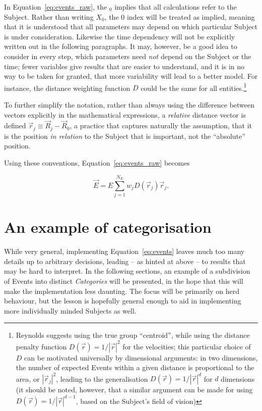 \documentclass[]{article} %
\begin{document}
In Equation~\eqref{eq:events_raw}, the $_0$ implies that all calculations refer to the Subject. 
Rather than writing $X_0$, the $0$ index will be treated as implied, meaning that it is understood that all parameters may depend on which particular Subject is under consideration.
Likewise the time dependency will not be explicitly written out in the following paragraphs.
It may, however, be a good idea to consider in every step, which parameters need \emph{not} depend on the Subject or the time; fewer variables give results that are easier to understand, and it is in no way to be taken for granted, that more variability will lead to a better model.
For instance, the distance weighting function $D$ could be the same for all entities.\footnote{Reynolds \cite{Reynolds1987} suggests using the true group ``centroid'', while using the distance penalty function $D(\vec{r}) = 1/\left|\vec{r}\right|^{2}$ for the velocities; this particular choice of $D$ can be motivated universally by dimensional arguments: in two dimensions, the number of expected Events within a given distance is proportional to the area, or $\left|\vec{r}_j\right|^2$, leading to the generalisation $D(\vec{r}) = 1/\left|\vec{r}\right|^{d}$ for $d$ dimensions (it should be noted, however, that a similar argument can be made for using $D(\vec{r}) = 1/\left|\vec{r}\right|^{d-1}$, based on the Subject's field of vision)}

To further simplify the notation, rather than always using the difference between vectors explicitly in the mathematical expressions, a \emph{relative} distance vector is defined $\vec{r}_j \equiv \vec{R}_j - \vec{R}_0$, a practice that captures naturally the assumption, that it is the position \emph{in relation} to the Subject that is important, not the ``absolute'' position.

Using these conventions, Equation~\eqref{eq:events_raw} becomes

\begin{equation}
 \label{eq:events}
 \vec{E} = E\sum_{j=1}^{N_E} w_j D(\vec{r}_j)\vec{r}_j.
\end{equation}


\section{An example of categorisation}
\label{sec:categories}
While very general, implementing Equation~\eqref{eq:events} leaves much too many details up to arbitrary decisions, leading -- as hinted at above -- to results that may be hard to interpret.
In the following sections, an example of a subdivision of Events into distinct \emph{Categories} will be presented, in the hope that this will make the implementation less daunting. 
The focus will be primarily on herd behaviour, but the lesson is hopefully general enough to aid in implementing more individually minded Subjects as well.
\end{document}
